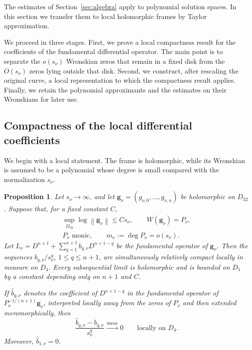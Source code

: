 \documentclass[12pt,letterpaper,reqno]{amsart}
\newtheorem{prop}[thm]{Proposition}
\theoremstyle{definition}
\numberwithin{equation}{section}
\newcommand{\norm}[1]{\left\lVert#1\right\rVert}
\newcommand{\convmeas}{\xrightarrow{\,\mathrm{meas}\,}}
\newcommand{\gv}{\bm g}
\begin{document}
The estimates of Section~\ref{sec:algebra} apply to polynomial solution
spaces. In this section we transfer them to local holomorphic frames by
Taylor approximation.

We proceed in three stages. First, we prove a local compactness result
for the coefficients of the fundamental differential operator. The main
point is to separate the \(o(s_\nu)\) Wronskian zeros that remain in a
fixed disk from the \(O(s_\nu)\) zeros lying outside that disk. Second,
we construct, after rescaling the original curve, a local representation
to which the compactness result applies. Finally, we retain the
polynomial approximants and the estimates on their Wronskians for later
use.


\subsection{Compactness of the local differential coefficients}
\label{sec:local-coefficient-compactness}

We begin with a local statement. The frame is holomorphic, while its
Wronskian is assumed to be a polynomial whose degree is small compared
with the normalization \(s_\nu\).

\begin{prop}\label{prop:localcompact}
Let \(s_\nu\to\infty\), and let
\(\gv_\nu=(g_{\nu,0},\ldots,g_{\nu,n})\) be holomorphic on \(D_{32}\).
Suppose that, for a fixed constant \(C\),
\begin{equation}\label{eq:localhyp}
 \begin{gathered}
 \sup_{D_{32}}\log\norm{\gv_\nu}\leq Cs_\nu,
 \qquad
 W(\gv_\nu)=P_\nu,\\
 P_\nu\text{ monic},
 \qquad
 m_\nu:=\deg P_\nu=o(s_\nu).
 \end{gathered}
\end{equation}
Let
\(L_\nu=D^{n+1}+\sum_{q=1}^{n+1}b_{q,\nu}D^{n+1-q}\)
be the fundamental operator of \(\gv_\nu\).
Then the sequences \(b_{q,\nu}/s_\nu^q\), \(1\leq q\leq n+1\), are
simultaneously relatively compact locally in measure on \(D_4\).
Every subsequential limit is holomorphic and is bounded on \(D_1\) by
a constant depending only on \({n+1}\) and \(C\).

If \(\widehat b_{q,\nu}\) denotes the coefficient of \(D^{n+1-q}\) in
the fundamental operator of \(P_\nu^{-1/(n+1)}\gv_\nu\), interpreted
locally away from the zeros of \(P_\nu\) and then extended
meromorphically, then
\begin{equation}\label{eq:gaugecomparison}
 \frac{\widehat b_{q,\nu}-b_{q,\nu}}{s_\nu^q}
 \convmeas0
 \qquad\text{locally on }D_4.
\end{equation}
Moreover, \(\widehat b_{1,\nu}=0\).
\end{prop}
\end{document}
